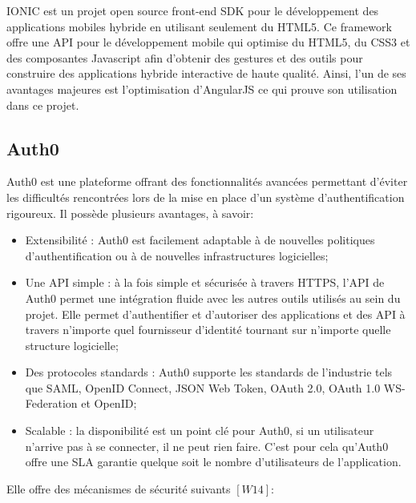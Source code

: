 IONIC est un projet open source front-end SDK pour le développement des applications mobiles hybride en utilisant seulement du HTML5. Ce framework offre une API pour le développement mobile qui optimise du HTML5, du CSS3 et des composantes Javascript afin d’obtenir des gestures et des outils pour construire des applications hybride interactive de haute qualité. Ainsi, l'un de ses avantages majeures est l'optimisation d’AngularJS ce qui prouve son utilisation dans ce projet.

\subsection{Auth0}
\label{auth0}

Auth0 est une plateforme offrant des fonctionnalités avancées permettant d'éviter les difficultés rencontrées lors de la mise en place d'un système d'authentification rigoureux. Il possède plusieurs avantages, à savoir:

\vspace{6pt}
\paragraphmark

\begin{itemize}
	\item Extensibilité : Auth0 est facilement adaptable à de nouvelles politiques d'authentification ou à de nouvelles infrastructures logicielles;
	\item Une API simple : à la fois simple et sécurisée à travers HTTPS, l'API de Auth0 permet une intégration fluide avec les autres outils utilisés au sein du projet. Elle permet d'authentifier et d'autoriser des applications et des API à travers n'importe quel fournisseur d'identité tournant sur n'importe quelle structure logicielle;
	\item Des protocoles standards : Auth0 supporte les standards de l'industrie tels que SAML, OpenID Connect, JSON Web Token, OAuth 2.0, OAuth 1.0 WS-Federation et OpenID;
	\item Scalable : la disponibilité est un point clé pour Auth0, si un utilisateur n'arrive pas à se connecter, il ne peut rien faire. C'est pour cela qu'Auth0 offre une SLA garantie quelque soit le nombre d'utilisateurs de l'application.
\end{itemize}

\vspace{6pt}
\paragraphmark

Elle offre des mécanismes de sécurité suivants $[W14]$:

\vspace{6pt}
\paragraphmark

